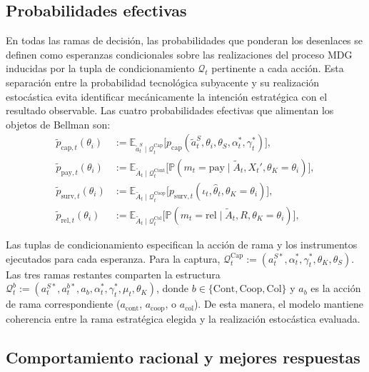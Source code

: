 \documentclass[pdflatex,sn-mathphys-ay]{sn-jnl}
\theoremstyle{thmstyleone}
\theoremstyle{thmstyletwo}
\theoremstyle{thmstylethree}
\newcommand{\E}{\mathbb{E}}
\newcommand{\Prob}{\mathbb{P}}
\newcommand{\1}{\mathbf{1}}
\begin{document}
\subsection{Probabilidades efectivas}\label{subsec:prob-efectivas}

En todas las ramas de decisión, las probabilidades que ponderan los desenlaces se definen como esperanzas condicionales sobre las realizaciones del proceso MDG inducidas por la tupla de condicionamiento $\mathcal{Q}_t$ pertinente a cada acción. Esta separación entre la probabilidad tecnológica subyacente y su realización estocástica evita identificar mecánicamente la intención estratégica con el resultado observable. Las cuatro probabilidades efectivas que alimentan los objetos de Bellman son:
\begin{align}
\tilde{p}_{\mathrm{cap},t}(\theta_i)
&:=\E_{\tilde{a}_t^S\mid\mathcal{Q}_t^{\mathrm{Cap}}}\!\bigl[p_{\mathrm{cap}}(\tilde{a}_t^S,\theta_i,\theta_S,\alpha_t^\ast,\gamma_t^\ast)\bigr],\label{eq:p-cap-eff}\\
\tilde{p}_{\mathrm{pay},t}(\theta_i)
&:=\E_{\tilde{A}_t\mid\mathcal{Q}_t^{\mathrm{Cont}}}\!\bigl[\Prob(m_t=\mathrm{pay}\mid\tilde{A}_t,X_t',\theta_K=\theta_i)\bigr],\label{eq:p-pay-eff}\\
\tilde{p}_{\mathrm{surv},t}(\theta_i)
&:=\E_{\tilde{A}_t\mid\mathcal{Q}_t^{\mathrm{Coop}}}\!\bigl[p_{\mathrm{surv},t}(\iota_t,\hat{\theta}_t,\theta_K=\theta_i)\bigr],\label{eq:p-surv-eff}\\
\tilde{p}_{\mathrm{rel},t}(\theta_i)
&:=\E_{\tilde{A}_t\mid\mathcal{Q}_t^{\mathrm{Col}}}\!\bigl[\Prob(m_t=\mathrm{rel}\mid\tilde{A}_t,R,\theta_K=\theta_i)\bigr],\label{eq:p-rel-eff}
\end{align}

Las tuplas de condicionamiento especifican la acción de rama y los instrumentos ejecutados para cada esperanza. Para la captura, $\mathcal{Q}_t^{\mathrm{Cap}}:=(a_t^{S\ast},\alpha_t^\ast,\gamma_t^\ast,\theta_K,\theta_S)$. Las tres ramas restantes comparten la estructura $\mathcal{Q}_t^{b}:=(a_t^{S\ast},a_t^{b\ast},a_b,\alpha_t^\ast,\gamma_t^\ast,\mu_t,\theta_K)$, donde $b\in\{\mathrm{Cont},\mathrm{Coop},\mathrm{Col}\}$ y $a_b$ es la acción de rama correspondiente ($a_{\mathrm{cont}}$, $a_{\mathrm{coop}}$, o $a_{\mathrm{col}}$). De esta manera, el modelo mantiene coherencia entre la rama estratégica elegida y la realización estocástica evaluada.

\subsection{Comportamiento racional y mejores respuestas}\label{subsec:bellman}
\end{document}
